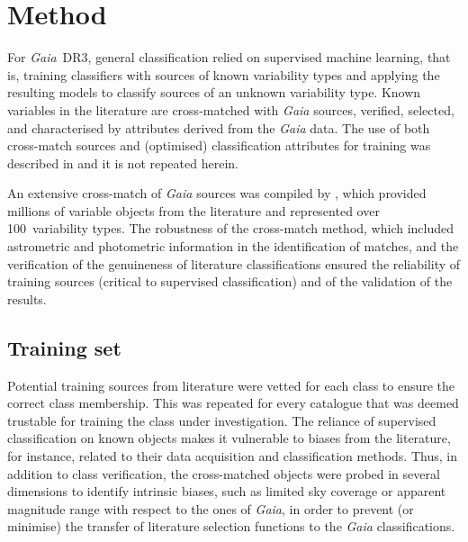 \documentclass[longauth]{aa}
\def\gaia{\textit{Gaia}\xspace}
\def\gdr3{\textit{Gaia}~DR3\xspace}
\begin{document}

\section{Method\label{sec:method}}

For \gdr3, general classification relied on supervised machine learning, that is, training classifiers with sources of known variability types and applying the resulting models to classify sources of an unknown variability type. 
Known variables in the literature are cross-matched with \gaia sources, verified, selected, and characterised by attributes derived from the \gaia data. The use of both cross-match sources and (optimised) classification attributes for training was described in \citet{2019A&A...625A..97R} and it is not repeated herein.

An extensive cross-match of \gaia sources was compiled by \citet{DR3-DPACP-177}, which provided millions of variable objects from the literature and represented over 100~variability types. 
The robustness of the cross-match method, which included astrometric and photometric information in the identification of matches, and the verification of the genuineness of literature classifications ensured the reliability of training sources (critical to supervised classification) and of the validation of the results.


\subsection{Training set\label{ssec:training}}

Potential training sources from literature were vetted for each class to ensure the correct class membership. This was repeated for every catalogue that was deemed trustable for training the class under investigation.
The reliance of supervised classification on known objects makes it vulnerable to biases from the literature, for instance, related to their data acquisition and classification methods.
Thus, in addition to class verification, the cross-matched objects were probed in several dimensions to identify intrinsic biases, such as limited sky coverage or apparent magnitude range with respect to the ones of \gaia, in order to prevent (or minimise) the transfer of literature selection functions to the \gaia classifications.
\end{document}
